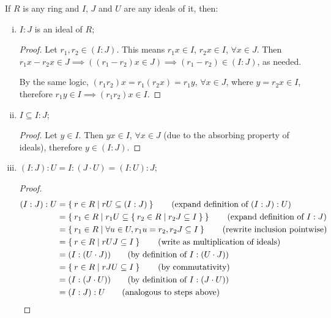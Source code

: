 \begin{problem*}{5}
If \(R\) is any ring and \(I\), \(J\) and \(U\) are any ideals of it, then:
\begin{enumerate}[(i)]
    \item \(I : J\) is an ideal of \(R\);
    \begin{proof}
    Let \(r_1, r_2 \in (I : J)\). This means \(r_1 x \in I\), \(r_2 x \in I\), \(\forall x \in J\). Then \(r_1 x - r_2 x \in J \implies ((r_1 - r_2) x \in J) \implies (r_1 - r_2) \in (I : J)\), as needed.
    
    By the same logic, \((r_1 r_2) x = r_1 (r_2 x) = r_1 y\), \(\forall x \in J\), where \(y = r_2 x \in I\), therefore \(r_1 y \in I \implies (r_1 r_2) x \in I\).
    \end{proof}
    
    \item \(I \subseteq I : J\);
    \begin{proof}
    Let \(y \in I\). Then \(y x \in I\), \(\forall x \in J\) (due to the absorbing property of ideals), therefore \(y \in (I : J)\).
    \end{proof}
    
    \item \((I : J) : U = I : (J \cdot U) = (I : U) : J\);
    \begin{proof}
    \begin{align*}
        (I : J) : U &= \Set{ r \in R \mid r U \subseteq (I : J) } \tag{expand definition of \((I : J) : U\)} \\
        &= \Set{ r_1 \in R \mid r_1 U \subseteq \Set{ r_2 \in R \mid r_2 J \subseteq I } } \tag{expand definition of \(I : J\)} \\
        &= \Set{ r_1 \in R \mid \forall u \in U, r_1 u = r_2, r_2 J \subseteq I } \tag{rewrite inclusion pointwise} \\
        &= \Set { r \in R \mid rUJ \subseteq I } \tag{write as multiplication of ideals} \\
        &= (I : (U \cdot J)) \tag{by definition of \(I : (U \cdot J)\)} \\
        &= \Set { r \in R \mid rJU \subseteq I } \tag{by commutativity} \\
        &= (I : (J \cdot U)) \tag{by definition of \(I : (J \cdot U)\)} \\
        &= (I : J) : U \tag{analogous to steps above}
    \end{align*}
    \end{proof}
    

\end{enumerate}
\end{problem*}
